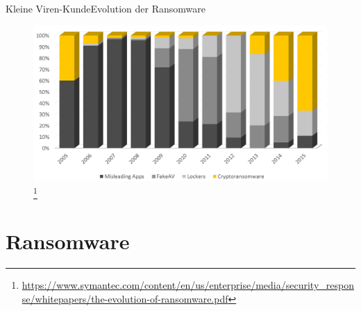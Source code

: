 \documentclass[10pt]{beamer}
\begin{document}
\begin{frame}{Kleine Viren-Kunde}{Evolution der Ransomware}
	\begin{figure}[p]
		\centering
		\includegraphics[scale=0.28]{ransom-evolution.png}
		\let\thefootnote\relax\footnote{\url{https://www.symantec.com/content/en/us/enterprise/media/security\_response/whitepapers/the-evolution-of-ransomware.pdf}}
	\end{figure}
\end{frame}


\section{Ransomware}
\end{document}
